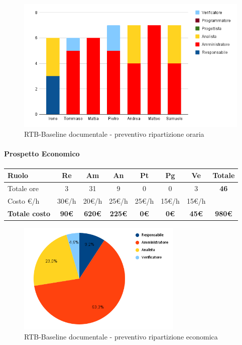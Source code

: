 \begin{figure}[H]
    \centering\includegraphics[width=\textwidth, height=\textheight, keepaspectratio]{images/preventivo/RTB-documentale-ore.png}
    \caption{RTB-Baseline documentale - preventivo ripartizione oraria}
\end{figure}


\paragraph{Prospetto Economico}
\begin{center}
	\renewcommand{\arraystretch}{1.8} %
	\begin{tabular}{ |m{10em}|c|c|c|c|c|c|c| }
	\hline
	\textbf{Ruolo} & \textbf{Re} & \textbf{Am} &  \textbf{An} &  \textbf{Pt} &  \textbf{Pg} &  \textbf{Ve} &  \textbf{Totale}\\
    \hline
    Totale ore & 3 & 31 & 9 & 0 & 0 & 3 & \textbf{46}\\
    \hline
    Costo \euro/h & 30\euro/h & 20\euro/h & 25\euro/h & 25\euro/h & 15\euro/h & 15\euro/h & \\
    \hline
    \textbf{Totale costo} & \textbf{90\euro} & \textbf{620\euro} &  \textbf{225\euro} &  \textbf{0\euro} &  \textbf{0\euro} &  \textbf{45\euro} &  \textbf{980\euro}\\
    \hline
	\end{tabular}

    \begin{figure}[H]
        \centering\includegraphics[width=0.7\textwidth, height=0.7\textheight, keepaspectratio]{images/preventivo/RTB-documentale-costo.png}
        \caption{RTB-Baseline documentale - preventivo ripartizione economica}
    \end{figure}
\end{center}


